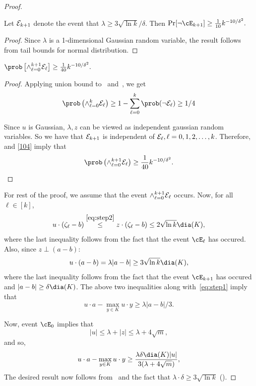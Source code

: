 \begin{proof}
\begin{fact}
\label{fact:3}
Let
${\cal E}_{k+1}$ denote the event that $\lambda\geq 3\sqrt{\ln k}/\delta.$ Then $\Pr[\neg \cE_{k+1}] \geq  \frac{1}{10} k^{-10/\delta^2}.$
\end{fact}
\begin{proof}
Since $\lambda$ is a 1-dimensional Gaussian random variable, the result follows from tail bounds for normal distribution. 
\end{proof}

\begin{corollary}
\label{cor:event}
$\prob\left[ \wedge_{\ell=0}^{k+1} {\cal E}_\ell\right] \geq \frac{1}{40}    k^{-10/\delta^2}.$
\end{corollary}

\begin{proof}
Applying union bound to~ and~, we get 
\begin{equation}
\label{104}
\prob\left( \wedge _{\ell=0}^{k}{\cal E}_\ell \right)\geq 1-\sum_{\ell=0}^{k}\prob(\neg {\cal E}_\ell)
\geq 1/4 
\end{equation}

Since $u$ is Gaussian, $\lambda , z$ can be viewed as independent gaussian random variables. So we have that ${\cal E}_{k+1}$ is independent of ${\cal E}_\ell,\ell=0,1,2,\ldots , k$. Therefore,~ and \eqref{104} imply that 
\begin{equation*}
\prob\left( \wedge_{\ell=0}^{k+1} {\cal E}_\ell\right)\geq  \frac{1}{40}    k^{-10/\delta^2}.
\end{equation*}
\end{proof}

For rest of the proof, we assume that the event $\wedge _{\ell=0}^{k+1}{\cal E}_\ell$ occurs. Now, for all $\ell \in [k]$, 
\begin{equation}\label{722}
u\cdot (\zeta_\ell-b) \stackrel{\eqref{eq:step2}}{\leq} z\cdot (\zeta_\ell-b)\leq
2\sqrt{\ln k} \dia(K),
\end{equation}
where the last inequality follows from the fact that the event $\cE_\ell$ has occured.
Also, since $z\perp (a-b)$:
\begin{equation}\label{723}
u\cdot (a-b)=\lambda |a-b|\geq 3\sqrt{\ln k} \dia(K),
\end{equation}
where the last inequality follows from the fact that the event $\cE_{k+1}$ has occured and $|a-b| \geq \delta \dia(K)$. 
The above two inequalities along with~\eqref{eq:step1} imply that 
$$u\cdot a - \max_{y\in K}u\cdot y \geq \lambda |a-b|/3.$$


Now, event $\cE_0$  implies that 
$$|u|\leq \lambda + |z|\leq \lambda+4\sqrt m, $$
and so, 
$$ u\cdot a - \max_{y\in K}u\cdot y  \geq \frac{\lambda \delta \dia(K) |u|}{3(\lambda + 4 \sqrt{m})},$$ 
The desired result now follows from~ and the fact that $\lambda \cdot \delta \geq 3 \sqrt{\ln k}$ (). 
\end{proof}


